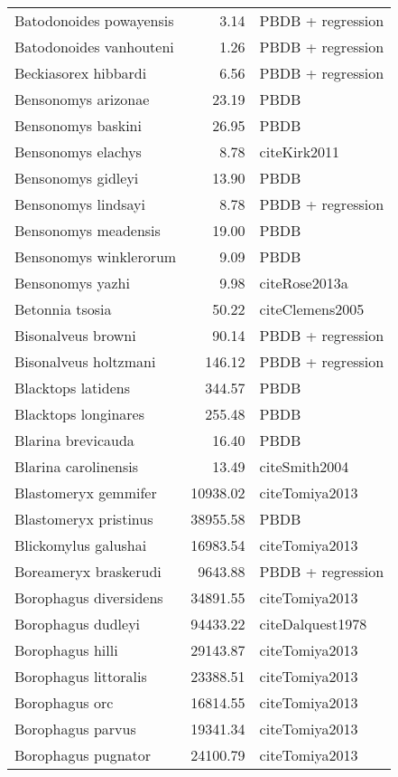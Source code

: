 \begin{table}[ht]
\begin{tabular}{lrl}
  Batodonoides powayensis & 3.14 & PBDB + regression \\ 
  Batodonoides vanhouteni & 1.26 & PBDB + regression \\ 
  Beckiasorex hibbardi & 6.56 & PBDB + regression \\ 
  Bensonomys arizonae & 23.19 & PBDB \\ 
  Bensonomys baskini & 26.95 & PBDB \\ 
  Bensonomys elachys & 8.78 & cite{Kirk2011} \\ 
  Bensonomys gidleyi & 13.90 & PBDB \\ 
  Bensonomys lindsayi & 8.78 & PBDB + regression \\ 
  Bensonomys meadensis & 19.00 & PBDB \\ 
  Bensonomys winklerorum & 9.09 & PBDB \\ 
  Bensonomys yazhi & 9.98 & cite{Rose2013a} \\ 
  Betonnia tsosia & 50.22 & cite{Clemens2005} \\ 
  Bisonalveus browni & 90.14 & PBDB + regression \\ 
  Bisonalveus holtzmani & 146.12 & PBDB + regression \\ 
  Blacktops latidens & 344.57 & PBDB \\ 
  Blacktops longinares & 255.48 & PBDB \\ 
  Blarina brevicauda & 16.40 & PBDB \\ 
  Blarina carolinensis & 13.49 & cite{Smith2004} \\ 
  Blastomeryx gemmifer & 10938.02 & cite{Tomiya2013} \\ 
  Blastomeryx pristinus & 38955.58 & PBDB \\ 
  Blickomylus galushai & 16983.54 & cite{Tomiya2013} \\ 
  Boreameryx braskerudi & 9643.88 & PBDB + regression \\ 
  Borophagus diversidens & 34891.55 & cite{Tomiya2013} \\ 
  Borophagus dudleyi & 94433.22 & cite{Dalquest1978} \\ 
  Borophagus hilli & 29143.87 & cite{Tomiya2013} \\ 
  Borophagus littoralis & 23388.51 & cite{Tomiya2013} \\ 
  Borophagus orc & 16814.55 & cite{Tomiya2013} \\ 
  Borophagus parvus & 19341.34 & cite{Tomiya2013} \\ 
  Borophagus pugnator & 24100.79 & cite{Tomiya2013} \\ 

\end{tabular}
\end{table}

